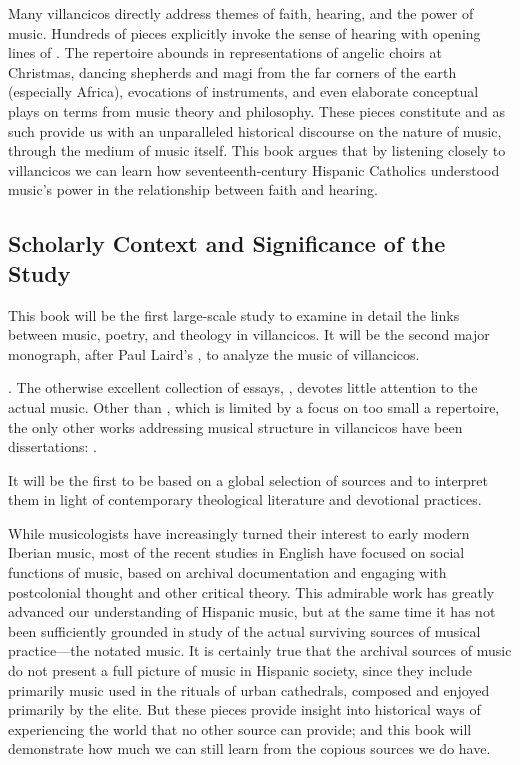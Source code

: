 \documentclass{vcbook-proposal}
\begin{document}
Many villancicos directly address themes of faith, hearing, and the power of 
music.
Hundreds of pieces explicitly invoke the sense of hearing with opening lines of 
  .
The repertoire abounds in representations of angelic choirs at Christmas, 
dancing shepherds and magi from the far corners of the earth (especially 
Africa), evocations of instruments, and even elaborate conceptual plays on 
terms from music theory and philosophy.
These pieces constitute  and as such provide us with 
an unparalleled historical discourse on the nature of music, through the medium 
of music itself.
This book argues that by listening closely to villancicos we can learn how
seventeenth-century Hispanic Catholics understood music's power in the
relationship between faith and hearing. 


\subsection{Scholarly Context and Significance of the Study}

This book will be the first large-scale study to examine in detail the links 
between music, poetry, and theology in villancicos.
It will be the second major monograph, after Paul Laird's , to analyze the music of villancicos.%
  \begin{Footnote}
      \Autocite{Laird:VC}. 
      The otherwise excellent collection of essays, 
      \autocite{Knighton-Torrente:VCs}, devotes little attention to the actual music.
      Other than \autocite{Rubio:Forma}, which is limited by a focus on too small a 
      repertoire, the only other works addressing musical structure in villancicos 
      have been dissertations: \autocites{CaberoPueyo:PhD}{Illari:Polychoral}.
  \end{Footnote}
It will be the first to be based on a global selection of sources and to 
interpret them in light of contemporary theological literature and devotional 
practices.

While musicologists have increasingly turned their interest to early modern 
Iberian music, most of the recent studies in English have focused on social 
functions of music, based on archival documentation and engaging with 
postcolonial thought and other critical theory.
This admirable work has greatly advanced our understanding of Hispanic music, 
but at the same time it has not been sufficiently grounded in study of the 
actual surviving sources of musical practice---the notated music.%
  \Autocites{Torrente:PhD}{Baker:Harmony}{Irving:Colonial}
  {BakerKnighton:MusicUrbanSociety}
It is certainly true that the archival sources of music do not present a full 
picture of music in Hispanic society, since they include primarily music used 
in the rituals of urban cathedrals, composed and enjoyed primarily by the elite.
But these pieces provide insight into historical ways of experiencing the world 
that no other source can provide; and this book will demonstrate how much we 
can still learn from the copious sources we do have.
\end{document}
